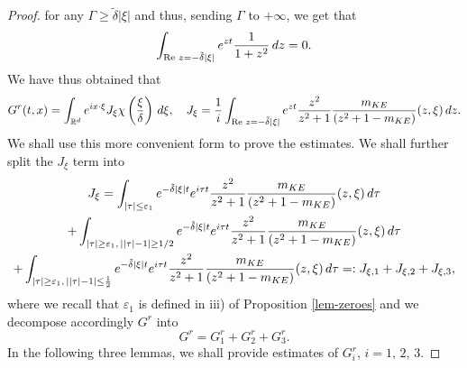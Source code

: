 \documentclass[11pt]{amsart}
\numberwithin{equation}{section}
\newcommand{\eps}{\varepsilon}
\begin{document}
\begin{proof}
     for any $\Gamma \geq \tilde \delta | \xi|$
     and thus, sending $\Gamma$ to $+ \infty$, we get that
     $$  \int_{\operatorname{Re}\, z = - \tilde \delta | \xi| } e^{ zt } { 1 \over  1+ z^2} \, dz = 0.$$
     We have thus obtained that
   \begin{equation}
   \label{Grbis}
    G^r(t,x)=  \int_{\mathbb{R}^d}  e^{ i x \cdot \xi}J_{\xi} \chi \left( { \xi \over \delta} \right) \, d \xi, \quad
    J_{\xi}= {1 \over i }
    \int_{\operatorname{Re}\, z = - \tilde \delta  | \xi| }e^{zt}   {z^2 \over z^2+1}   { m_{KE} \over (z^2+ 1 - m_{KE})}(z, \xi)\, dz. 
   \end{equation} 
 We shall use this more convenient form to prove the estimates.
We shall further  split the $J_{\xi}$ term  into
\begin{multline}
\label{splitIxi1}
J_{\xi}=  \int_{| \tau| \leq \eps_{1} }   e^{- \tilde \delta | \xi | t }  e^{i \tau t }{z^2 \over z^2+1}   { m_{KE} \over (z^2+ 1 - m_{KE})}(z, \xi)\, d\tau
 \\+  \int_{| \tau| \geq  \eps_{1}, \, ||\tau|- 1 | \geq 1/2  }   e^{- \tilde \delta | \xi | t }  e^{i \tau t }  {z^2 \over z^2+1}   { m_{KE} \over (z^2+ 1 - m_{KE})}(z, \xi)  \, d\tau
  \\ +    \int_{| \tau| \geq  \eps_{1}, \, ||\tau|- 1 | \leq  { 1 \over 2} }   e^{- \tilde \delta | \xi | t }  e^{i \tau t }
 {z^2 \over z^2+1} { m_{KE} \over (z^2+ 1 - m_{KE})}(z, \xi)
  \, d\tau
 =: J_{\xi, 1} + J_{\xi, 2} + J_{\xi, 3},
\end{multline}
where  we recall that $\eps_{1}$ is defined in iii) of Proposition \ref{lem-zeroes} 
and we decompose accordingly  $G^{r} $ into
\begin{equation}
\label{splitGr} G^r =  G^r_{1}+ G^r_{2} + G^r_{3}.
\end{equation}
In the following three lemmas, we shall provide estimates of $G^r_{i}$, $i=1, \, 2, \, 3$.


\end{proof}
\end{document}
